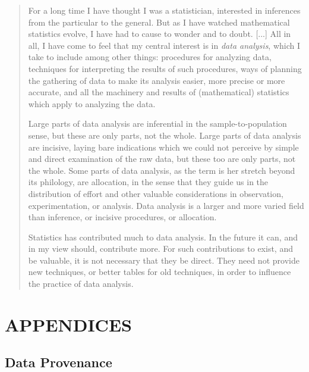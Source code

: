 \documentclass[]{article}
\begin{document}
\begin{quote}
For a long time I have thought I was a statistician, interested in inferences from the particular to the general.  But as I have watched mathematical statistics evolve, I have had to cause to wonder and to doubt. [...] All in all, I have come to feel that my central interest is in \emph{data analysis}, which I take to include among other things: procedures for analyzing data, techniques for interpreting the results of such procedures, ways of planning the gathering of data to make its analysis easier, more precise or more accurate, and all the machinery and results of (mathematical) statistics which apply to analyzing the data.

Large parts of data analysis are inferential in the sample-to-population sense, but these are only parts, not the whole.  Large parts of data analysis are incisive, laying bare indications which we could not perceive by simple and direct examination of the raw data, but these too are only parts, not the whole.  Some parts of data analysis, as the term is her stretch beyond its philology, are allocation, in the sense that they guide us in the distribution of effort and other valuable considerations in observation, experimentation, or analysis.  Data analysis is a larger and more varied field than inference, or incisive procedures, or allocation.

Statistics has contributed much to data analysis.  In the future it can, and in my view should, contribute more.  For such contributions to exist, and be valuable, it is not necessary that they be direct.  They need not provide new techniques, or better tables for old techniques, in order to influence the practice of data analysis.
\end{quote}

\newpage
\section{APPENDICES}
\label{sec:appendix}

\subsection{Data Provenance}
\label{sec:appendix-data-provenance}
\end{document}
